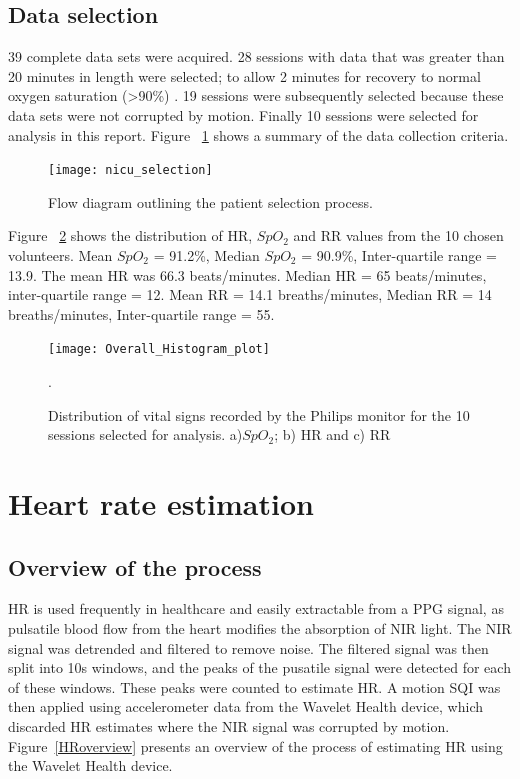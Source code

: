 \subsection{Data selection}
39 complete data sets were acquired. 28 sessions with data that was greater than 20 minutes in length were selected; to allow 2 minutes for recovery to normal oxygen saturation (>90\%) . 19 sessions were subsequently selected because these data sets were not corrupted by motion. Finally 10 sessions were selected for analysis in this report. Figure ~\ref{selection} shows a summary of the data collection criteria.

\begin{figure}[!ht]
    \centering
\texttt{[image: nicu\_selection]}
    \caption{Flow diagram outlining the patient selection process.}
    \label{selection} 
\end{figure}

Figure ~\ref{vs hist} shows the distribution of HR, $SpO_2$  and RR values from the 10 chosen volunteers. Mean $SpO_2$  = 91.2\%, Median $SpO_2$ = 90.9\%, Inter-quartile range = 13.9. The mean HR was 66.3 beats/minutes. Median HR = 65 beats/minutes, inter-quartile range = 12. Mean RR = 14.1 breaths/minutes, Median RR = 14 breaths/minutes, Inter-quartile range = 55.

\begin{figure}[!ht]
    \centering
\texttt{[image: Overall\_Histogram\_plot]}
    \caption [Distribution of vital signs recorded by the Philips monitor for the 10 sessions selected for analysis.]{Distribution of vital signs recorded by the Philips monitor for the 10 sessions selected for analysis. a)$SpO_2$; b) HR and c) RR}. 
    \label{vs hist} 
\end{figure}

\section{Heart rate estimation}
\label{HR est_wav}


\subsection{Overview of the process}

HR is used frequently in healthcare and easily extractable from a PPG signal, as pulsatile blood flow from the heart modifies the absorption of NIR light. The NIR signal was detrended and filtered to remove noise. The filtered signal was then split into 10s windows, and the peaks of the pusatile signal were detected for each of these windows. These peaks were counted to estimate HR. A motion SQI was then applied using accelerometer data from the Wavelet Health device, which discarded HR estimates where the NIR signal was corrupted by motion. Figure~\ref{HRoverview} presents an overview of the process of estimating HR using the Wavelet Health device. 

